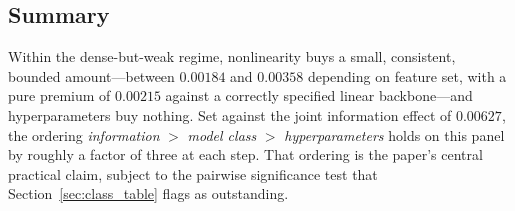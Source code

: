 \subsection{Summary}
\label{sec:class_summary}

Within the dense-but-weak regime, nonlinearity buys a small, consistent,
bounded amount---between $0.00184$ and $0.00358$ depending on feature set, with
a pure premium of $0.00215$ against a correctly specified linear backbone---and
hyperparameters buy nothing. Set against the joint information effect of
$0.00627$, the ordering
\emph{information} $>$ \emph{model class} $>$ \emph{hyperparameters} holds on
this panel by roughly a factor of three at each step. That ordering is the
paper's central practical claim, subject to the pairwise significance test that
Section~\ref{sec:class_table} flags as outstanding.
